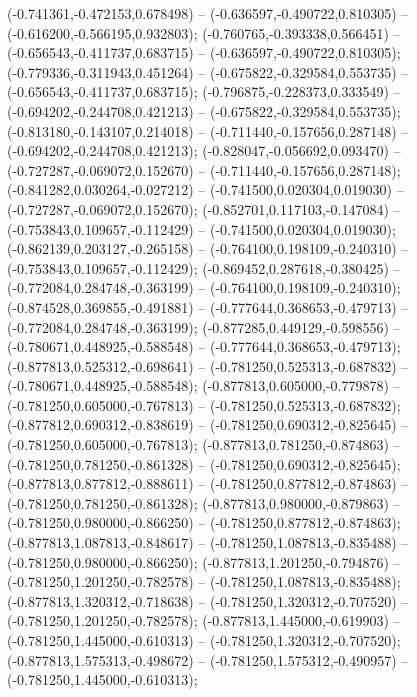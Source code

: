  (-0.741361,-0.472153,0.678498) -- (-0.636597,-0.490722,0.810305) -- (-0.616200,-0.566195,0.932803);
 (-0.760765,-0.393338,0.566451) -- (-0.656543,-0.411737,0.683715) -- (-0.636597,-0.490722,0.810305);
 (-0.779336,-0.311943,0.451264) -- (-0.675822,-0.329584,0.553735) -- (-0.656543,-0.411737,0.683715);
 (-0.796875,-0.228373,0.333549) -- (-0.694202,-0.244708,0.421213) -- (-0.675822,-0.329584,0.553735);
 (-0.813180,-0.143107,0.214018) -- (-0.711440,-0.157656,0.287148) -- (-0.694202,-0.244708,0.421213);
 (-0.828047,-0.056692,0.093470) -- (-0.727287,-0.069072,0.152670) -- (-0.711440,-0.157656,0.287148);
 (-0.841282,0.030264,-0.027212) -- (-0.741500,0.020304,0.019030) -- (-0.727287,-0.069072,0.152670);
 (-0.852701,0.117103,-0.147084) -- (-0.753843,0.109657,-0.112429) -- (-0.741500,0.020304,0.019030);
 (-0.862139,0.203127,-0.265158) -- (-0.764100,0.198109,-0.240310) -- (-0.753843,0.109657,-0.112429);
 (-0.869452,0.287618,-0.380425) -- (-0.772084,0.284748,-0.363199) -- (-0.764100,0.198109,-0.240310);
 (-0.874528,0.369855,-0.491881) -- (-0.777644,0.368653,-0.479713) -- (-0.772084,0.284748,-0.363199);
 (-0.877285,0.449129,-0.598556) -- (-0.780671,0.448925,-0.588548) -- (-0.777644,0.368653,-0.479713);
 (-0.877813,0.525312,-0.698641) -- (-0.781250,0.525313,-0.687832) -- (-0.780671,0.448925,-0.588548);
 (-0.877813,0.605000,-0.779878) -- (-0.781250,0.605000,-0.767813) -- (-0.781250,0.525313,-0.687832);
 (-0.877812,0.690312,-0.838619) -- (-0.781250,0.690312,-0.825645) -- (-0.781250,0.605000,-0.767813);
 (-0.877813,0.781250,-0.874863) -- (-0.781250,0.781250,-0.861328) -- (-0.781250,0.690312,-0.825645);
 (-0.877813,0.877812,-0.888611) -- (-0.781250,0.877812,-0.874863) -- (-0.781250,0.781250,-0.861328);
 (-0.877813,0.980000,-0.879863) -- (-0.781250,0.980000,-0.866250) -- (-0.781250,0.877812,-0.874863);
 (-0.877813,1.087813,-0.848617) -- (-0.781250,1.087813,-0.835488) -- (-0.781250,0.980000,-0.866250);
 (-0.877813,1.201250,-0.794876) -- (-0.781250,1.201250,-0.782578) -- (-0.781250,1.087813,-0.835488);
 (-0.877813,1.320312,-0.718638) -- (-0.781250,1.320312,-0.707520) -- (-0.781250,1.201250,-0.782578);
 (-0.877813,1.445000,-0.619903) -- (-0.781250,1.445000,-0.610313) -- (-0.781250,1.320312,-0.707520);
 (-0.877813,1.575313,-0.498672) -- (-0.781250,1.575312,-0.490957) -- (-0.781250,1.445000,-0.610313);
